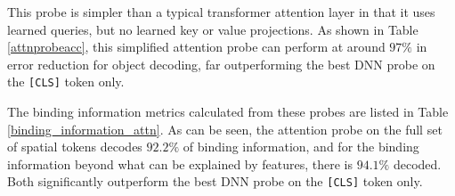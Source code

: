 \documentclass{article}
\theoremstyle{plain}
\theoremstyle{definition}
\theoremstyle{remark}
\begin{document}
This probe is simpler than a typical transformer attention layer in that it uses learned queries, but no learned key or value projections. As shown in Table \ref{attnprobeacc}, this simplified attention probe can perform at around $97\%$ in error reduction for object decoding, far outperforming the best DNN probe on the \texttt{[CLS]} token only.

\begin{table}[H]
\centering
\caption{\textbf{Average performance of attention probes with quadratic readout using the full set of spatial tokens}, compared to the best-performing \texttt{[CLS]} probe for object and feature code prediction. We report error reduction (ER) relative to the trivial majority-label baselines, which achieve $71.9\%$ accuracy for object codes and $75.0\%$ accuracy for feature codes.}
\label{attnprobeacc}
\end{table}

The binding information metrics calculated from these probes are listed in Table \ref{binding_information_attn}. As can be seen, the attention probe on the full set of spatial tokens decodes $92.2\%$ of binding information, and for the binding information beyond what can be explained by features, there is $94.1\%$ decoded. Both significantly outperform the best DNN probe on the \texttt{[CLS]} token only.
\end{document}

